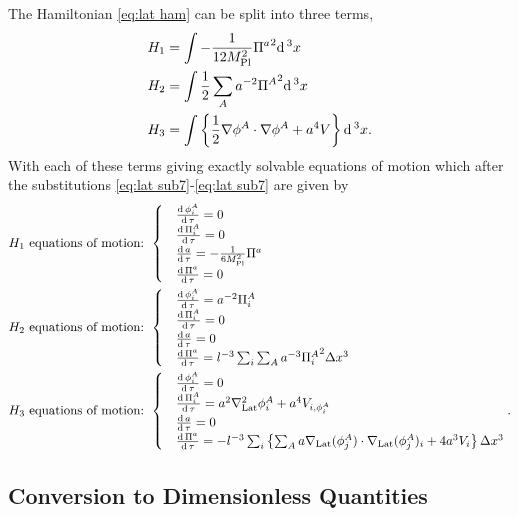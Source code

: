 The Hamiltonian \eqref{eq:lat ham} can be split into three terms,
\begin{align} 
  & H_1 = \int-\frac{1}{12M_{\mathrm{Pl}}^2}{\Pi^a}^2\mathrm{d}\,^3x  \label{eq:ham split1}  \\
  & H_2 = \int\frac{1}{2}\sum_Aa^{-2}{\Pi^A}^2\mathrm{d}\,^3x  \label{eq:ham split2}  \\
  & H_3 = \int\left\{\frac{1}{2}\nabla\phi^A\cdot\nabla\phi^A + a^4V\right\}\mathrm{d}\,^3x. \label{eq:ham split3}
\end{align}
With each of these terms giving exactly solvable equations of motion which after the substitutions \eqref{eq:lat sub7}-\eqref{eq:lat sub7} are given by
\begin{align}
  H_1 \text{ equations of motion: }
  & \begin{cases}
      & \frac{\mathrm{d}\,\phi^A_i}{\mathrm{d}\,\tau} = 0 \\
      & \frac{\mathrm{d}\,\Pi^A_i}{\mathrm{d}\,\tau} = 0 \\
      & \frac{\mathrm{d}\, a}{\mathrm{d}\,\tau} = -\frac{1}{6M_{\mathrm{Pl}}^2}\Pi^a \\
      & \frac{\mathrm{d}\,\Pi^a}{\mathrm{d}\,\tau} = 0
    \end{cases} \\
  H_2 \text{ equations of motion: }
  & \begin{cases}
      & \frac{\mathrm{d}\,\phi^A_i}{\mathrm{d}\,\tau} = a^{-2}\Pi^A_i \\
      & \frac{\mathrm{d}\,\Pi^A_i}{\mathrm{d}\,\tau} = 0 \\
      & \frac{\mathrm{d}\, a}{\mathrm{d}\,\tau} = 0 \\
      & \frac{\mathrm{d}\,\Pi^a}{\mathrm{d}\,\tau} = l^{-3}\sum_i\sum_Aa^{-3}{\Pi^A_i}^2\Delta x^3
    \end{cases} \\
  H_3 \text{ equations of motion: }
  & \begin{cases}
      & \frac{\mathrm{d}\,\phi^A_i}{\mathrm{d}\,\tau} = 0 \\
      & \frac{\mathrm{d}\,\Pi^A_i}{\mathrm{d}\,\tau} = a^2\nabla^2_{\mathrm{Lat}}\phi^A_i + a^4V_{i,\phi^A_i} \\
      & \frac{\mathrm{d}\, a}{\mathrm{d}\,\tau} = 0 \\
      & \frac{\mathrm{d}\,\Pi^a}{\mathrm{d}\,\tau} = -l^{-3}\sum_i\left\{
      \sum_Aa\nabla_{\mathrm{Lat}}(\phi^A_j)\cdot\nabla_{\mathrm{Lat}}(\phi^A_j)_i +4a^3V_i
      \right\}\Delta x^3
    \end{cases}.
\end{align}

\subsection{Conversion to Dimensionless Quantities}
